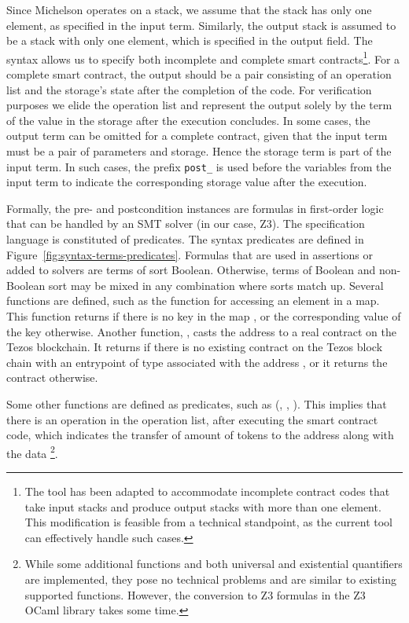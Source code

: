 \documentclass[a4paper,USenglish,cleveref, autoref,anonymous]{lipics-v2021}
\begin{document}
Since Michelson operates on a stack, we assume that the stack has only one
element, as specified in the input term. Similarly, the output
stack is assumed to be a stack with only one element, which is
specified in the output field. The syntax allows us to specify both
incomplete and complete smart contracts\footnote{The tool has been adapted to accommodate incomplete contract codes that take input stacks and produce output stacks with more than one element. This modification is feasible from a technical standpoint, as the current tool can effectively handle such cases.}. For a complete smart contract, the output should be a pair consisting of an operation list and the storage's state after the completion of the code.  For verification purposes we elide the operation list and represent the output solely by the term of the value in the storage after the execution concludes. In some cases, the output term can be omitted for a complete contract, given that the input term must be a pair
of parameters and storage. Hence the storage term is part of the
input term. In such cases, the prefix \lstinline/post_/ is used
before the variables from the input term to indicate the corresponding
storage value after the execution.

Formally, the pre- and postcondition instances are formulas in first-order logic that can be handled by an SMT solver (in our case, Z3). The specification language is constituted of predicates.  The syntax predicates are defined in Figure~\ref{fig:syntax-terms-predicates}. Formulas that are used in assertions or added to solvers are terms of sort Boolean. Otherwise, terms of
Boolean and non-Boolean sort may be mixed in any combination where
sorts match up. Several functions are defined, such as the function  for accessing an element in a map. This function returns  if there is no key  in the map , or the corresponding value of the key otherwise. Another function, , casts the address  to a real contract on the Tezos blockchain. It returns  if there is no existing contract on the Tezos block chain with an entrypoint of type  associated with the address , or it returns the contract otherwise.

Some other functions are defined as predicates, such as  (, , ). This implies that there is an operation in the operation list, after executing the smart contract code, which indicates the transfer of  amount of tokens to the address  along with the data \footnote{While some additional functions and both universal and existential quantifiers are implemented, they pose no technical problems and are similar to existing supported functions. However, the conversion to Z3 formulas in the Z3 OCaml library takes some time.}.
\end{document}
